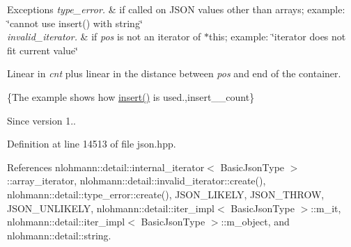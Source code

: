 \begin{DoxyExceptions}{Exceptions}
{\em type\+\_\+error.} & if called on J\+S\+ON values other than arrays; example\+: {\ttfamily \char`\"{}cannot use insert() with string\char`\"{}} \\
\hline
{\em invalid\+\_\+iterator.} & if {\itshape pos} is not an iterator of $\ast$this; example\+: {\ttfamily \char`\"{}iterator does not fit current value\char`\"{}}\\
\hline
\end{DoxyExceptions}
Linear in {\itshape cnt} plus linear in the distance between {\itshape pos} and end of the container.

\{The example shows how {\ttfamily \hyperlink{classnlohmann_1_1basic__json_a0136728f5db69d4051c77b94307abd6c}{insert()}} is used.,insert\+\_\+\+\_\+count\}

\begin{DoxySince}{Since}
version 1.. 
\end{DoxySince}


Definition at line 14513 of file json.\+hpp.



References nlohmann\+::detail\+::internal\+\_\+iterator$<$ Basic\+Json\+Type $>$\+::array\+\_\+iterator, nlohmann\+::detail\+::invalid\+\_\+iterator\+::create(), nlohmann\+::detail\+::type\+\_\+error\+::create(), J\+S\+O\+N\+\_\+\+L\+I\+K\+E\+LY, J\+S\+O\+N\+\_\+\+T\+H\+R\+OW, J\+S\+O\+N\+\_\+\+U\+N\+L\+I\+K\+E\+LY, nlohmann\+::detail\+::iter\+\_\+impl$<$ Basic\+Json\+Type $>$\+::m\+\_\+it, nlohmann\+::detail\+::iter\+\_\+impl$<$ Basic\+Json\+Type $>$\+::m\+\_\+object, and nlohmann\+::detail\+::string.


